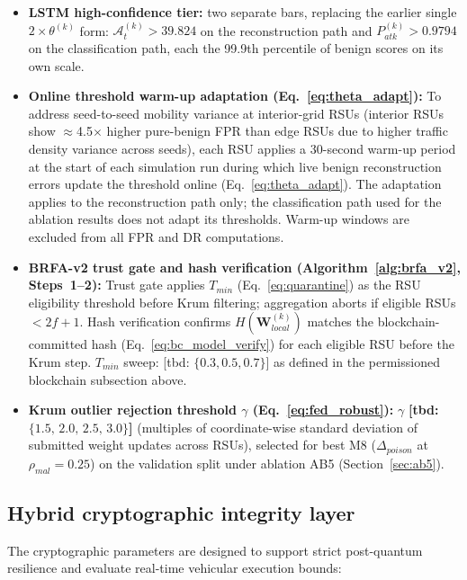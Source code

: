 \documentclass[12pt, a4paper]{report}
\begin{document}
{{\begin{itemize}
    \item \textbf{LSTM high-confidence tier:} two separate bars, replacing the earlier single $2\times\theta^{(k)}$ form: $\mathcal{A}_t^{(k)} > 39.824$ on the reconstruction path and $P_{atk}^{(k)} > 0.9794$ on the classification path, each the 99.9th percentile of benign scores on its own scale.

    \item \textbf{Online threshold warm-up adaptation
    (Eq.~\ref{eq:theta_adapt}):}
    To address seed-to-seed mobility variance at
    interior-grid \ac{RSU}s (interior \ac{RSU}s show
    $\approx$4.5$\times$ higher pure-benign \ac{FPR}
    than edge \ac{RSU}s due to higher traffic density
    variance across seeds), each \ac{RSU} applies a
    30-second warm-up period at the start of each
    simulation run during which live benign
    reconstruction errors update the threshold online
    (Eq.~\ref{eq:theta_adapt}). The adaptation applies to
    the reconstruction path only; the classification path
    used for the ablation results does not adapt its
    thresholds.
    Warm-up windows are excluded from all \ac{FPR}
    and \ac{DR} computations.

    \item \textbf{BRFA-v2 trust gate and hash verification         (Algorithm~\ref{alg:brfa_v2}, Steps~1--2):} Trust gate applies $T_{min}$
            (Eq.~\ref{eq:quarantine}) as the RSU eligibility threshold before Krum filtering; aggregation aborts if eligible RSUs $< 2f{+}1$. Hash verification confirms $H(\mathbf{W}_{local}^{(k)})$ matches the blockchain-committed hash
            (Eq.~\ref{eq:bc_model_verify}) for each eligible RSU before the Krum step.
            $T_{min}$ sweep: [tbd: $\{0.3, 0.5, 0.7\}$] as defined in the permissioned blockchain subsection above.
    \item \textbf{Krum outlier rejection threshold $\gamma$ (Eq.~\ref{eq:fed_robust}):}
        $\gamma$ \textbf{[tbd: $\{1.5,\, 2.0,\, 2.5,\,3.0\}$]} (multiples of coordinate-wise standard deviation of submitted weight updates across RSUs), selected
        for best M8 ($\Delta_{poison}$ at $\rho_{mal} = 0.25$) on the validation split under ablation AB5 (Section~\ref{sec:ab5}).


\end{itemize}

\subsection{Hybrid cryptographic integrity layer}
The cryptographic parameters are designed to support strict post-quantum resilience and evaluate real-time vehicular execution bounds:

}}
\end{document}

